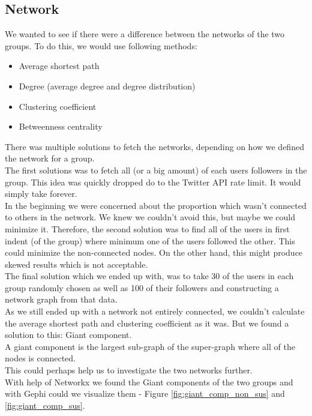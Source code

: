 \documentclass[10pt]{IEEEtran}
\begin{document}
\subsection{Network}
We wanted to see if there were a difference between the networks of the two groups. To do this, we would use following methods:\\
\begin{itemize}
  \item Average shortest path
  \item Degree (average degree and degree distribution)
  \item Clustering coefficient
  \item Betweenness centrality \\
\end{itemize}
 There was multiple solutions to fetch the networks, depending on how we defined the network for a group. \\
The first solutions was to fetch all (or a big amount) of each users followers in the group. This idea was quickly dropped do to the Twitter API rate limit. It would simply take forever. \\
In the beginning we were concerned about the proportion which wasn't connected to others in the network. We knew we couldn't avoid this, but maybe we could minimize it. Therefore, the second solution was to find all of the users in first indent (of the group) where minimum one of the users followed the other. This could minimize the non-connected nodes. On the other hand, this might produce skewed results which is not acceptable. \\
The final solution which we ended up with, was to take 30 of the users in each group randomly chosen as well as 100 of their followers and constructing a network graph from that data. \\

As we still ended up with a network not entirely connected, we couldn't calculate the average shortest path and clustering coefficient as it was. But we found a solution to this: Giant component. \\
A giant component is the largest sub-graph of the super-graph where all of the nodes is connected. \\
This could perhaps help us to investigate the two networks further. \\

With help of Networkx\cite{networkx} we found the Giant components of the two groups and with Gephi\cite{gephi} could we visualize them - Figure \ref{fig:giant_comp_non_sus} and \ref{fig:giant_comp_sus}.
\end{document}
